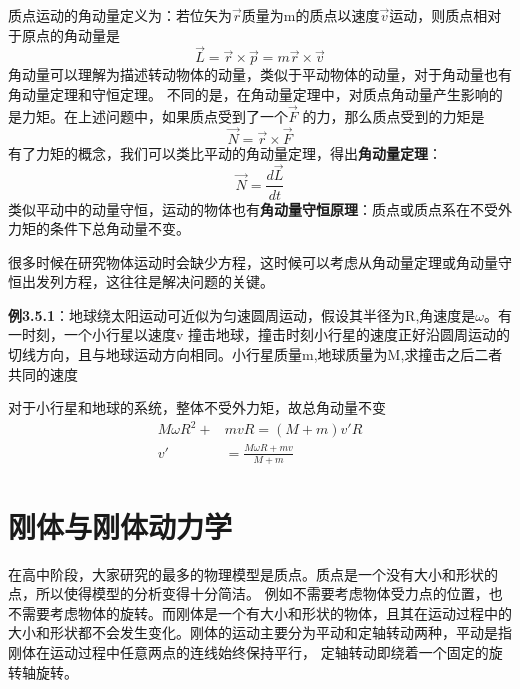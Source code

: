 \documentclass{article}
\begin{document}
    质点运动的角动量定义为：若位矢为\(\vec{r}\)质量为m的质点以速度\(\vec{v}\)运动，则质点相对于原点的角动量是
    \begin{equation*}
        \vec{L} = \vec{r} \times \vec{p} = m \vec{r} \times \vec{v}
    \end{equation*}
    角动量可以理解为描述转动物体的动量，类似于平动物体的动量，对于角动量也有角动量定理和守恒定理。
    不同的是，在角动量定理中，对质点角动量产生影响的是力矩。在上述问题中，如果质点受到了一个\(\vec{F}\)
    的力，那么质点受到的力矩是
    \begin{equation*}
        \vec{N} = \vec{r} \times \vec{F}
    \end{equation*}
    有了力矩的概念，我们可以类比平动的角动量定理，得出\textbf{角动量定理}：
    \begin{equation*}
        \vec{N} = \frac{d\vec{L}}{dt}
    \end{equation*}
    类似平动中的动量守恒，运动的物体也有\textbf{角动量守恒原理}：质点或质点系在不受外力矩的条件下总角动量不变。
    
    很多时候在研究物体运动时会缺少方程，这时候可以考虑从角动量定理或角动量守恒出发列方程，这往往是解决问题的关键。

    \textbf{例3.5.1}：地球绕太阳运动可近似为匀速圆周运动，假设其半径为R,角速度是\(\omega\)。有一时刻，一个小行星以速度v
    撞击地球，撞击时刻小行星的速度正好沿圆周运动的切线方向，且与地球运动方向相同。小行星质量m,地球质量为M,求撞击之后二者共同的速度

    对于小行星和地球的系统，整体不受外力矩，故总角动量不变
    \begin{align*}
        M \omega R^2 +& mvR = (M+m)v\prime R \\
        v\prime &= \frac{M\omega R + mv}{M+m}
    \end{align*}





\section{刚体与刚体动力学}
    在高中阶段，大家研究的最多的物理模型是质点。质点是一个没有大小和形状的点，所以使得模型的分析变得十分简洁。
    例如不需要考虑物体受力点的位置，也不需要考虑物体的旋转。而刚体是一个有大小和形状的物体，且其在运动过程中的
    大小和形状都不会发生变化。刚体的运动主要分为平动和定轴转动两种，平动是指刚体在运动过程中任意两点的连线始终保持平行，
    定轴转动即绕着一个固定的旋转轴旋转。
\end{document}
